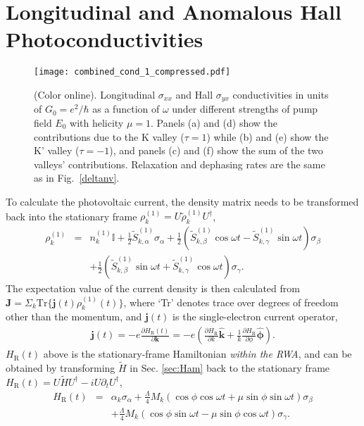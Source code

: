 \documentclass[reprint,amsmath,amssymb,aps,prb]{revtex4-1}
\begin{document}
\section{Longitudinal and Anomalous Hall Photoconductivities} \label{sec:dcI}

%
\begin{figure*}[htb]
  \texttt{[image: combined\_cond\_1\_compressed.pdf]}
  \caption{(Color online). Longitudinal $\sigma_{xx}$ and Hall $\sigma_{yx}$ conductivities in units of $G_0=e^2/\hbar$ as a function of $\omega$ under different strengths of pump field $E_0$ with helicity $\mu=1$. Panels  (a) and (d) show the contributions due to the K valley ($\tau =1$) while (b) and (e) show the K' valley ($\tau =-1$), and panels (c) and (f) show the sum of the two valleys' contributions. Relaxation and dephasing rates are the same as in Fig.~\ref{deltanv}. } \label{Jyt1t2}
\end{figure*}
%
To calculate the photovoltaic current, the density matrix needs to be transformed back into the stationary frame $\rho_k^{(1)}=U\tilde{\rho}_k^{(1)}U^{\dagger}$, 
% 
\begin{eqnarray}
\rho_k^{(1)} &=& n_k^{(1)}\mathbb{I} + \frac{1}{2}\tilde{S}_{k,\alpha}^{(1)}\sigma_\alpha + \frac{1}{2}\left( \tilde{S}_{k,\beta}^{(1)} \cos\omega t- \tilde{S}_{k,\gamma}^{(1)}\sin\omega t\right)\sigma_\beta \nonumber \\
&&+\frac{1}{2}\left(\tilde{S}_{k,\beta}^{(1)}\sin\omega t  + \tilde{S}_{k,\gamma}^{(1)}\cos\omega t \right)\sigma_\gamma. \label{lf1st}
\end{eqnarray}
%
The expectation value of the current density is then calculated from $\bm{J}=\Sigma_k \mathrm{Tr}\{\bm{j}(t) \rho_k^{(1)}(t)\}$, where `Tr' denotes trace over degrees of freedom other than the  momentum, and $\bm{j}(t)$ is the single-electron current operator, 
%
\begin{eqnarray} \label{jkop}
\bm{j}(t)=-e\frac{\partial H_{\mathrm{R}}(t)}{\partial \bm{k}}=-e\left(\frac{\partial H_{\mathrm{R}}}{\partial k}\hat{\bm{k}}+\frac{1}{k}\frac{\partial H_{\mathrm{R}}}{\partial \phi}\hat{\bm{\phi}}\right).
\end{eqnarray}
%
$H_{\mathrm{R}}(t)$ above is the stationary-frame Hamiltonian \textit{within the RWA}, and can be obtained by transforming $\tilde{H}$ in Sec. \ref{sec:Ham} back to the stationary frame $H_{\mathrm{R}}(t) = U\tilde{H}U^{\dagger}-iU\partial_t U^{\dagger}$,
%
\begin{eqnarray}
H_{\mathrm{R}}(t) 
&=&\alpha_k\sigma_\alpha+\frac{\Lambda}{4}M_k\left(\cos\phi\cos\omega t+\mu\sin\phi\sin\omega t\right)\sigma_\beta \nonumber \\
&& + \frac{\Lambda}{4}M_k\left(\cos\phi\sin\omega t-\mu\sin\phi\cos\omega t\right)\sigma_\gamma. \label{ham'_stat}
\end{eqnarray}
\end{document}
